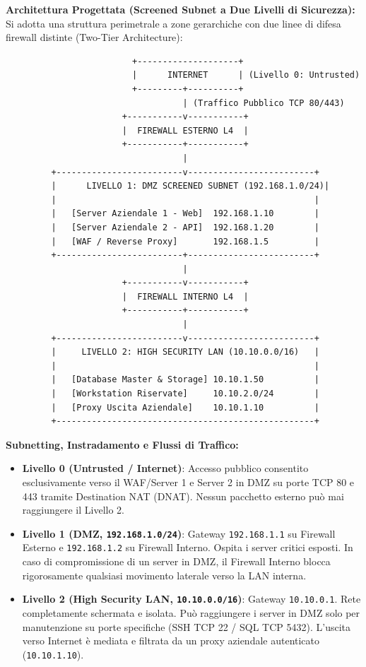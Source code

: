 \documentclass[11pt,a4paper]{article}
\begin{document}
\begin{solutionbox}
\textbf{Architettura Progettata (Screened Subnet a Due Livelli di Sicurezza):}
Si adotta una struttura perimetrale a zone gerarchiche con due linee di difesa firewall distinte (Two-Tier Architecture):
\begin{center}
\begin{verbatim}
                         +--------------------+
                         |      INTERNET      | (Livello 0: Untrusted)
                         +---------+----------+
                                   | (Traffico Pubblico TCP 80/443)
                       +-----------v-----------+
                       |  FIREWALL ESTERNO L4  |
                       +-----------+-----------+
                                   |
         +-------------------------v-------------------------+
         |      LIVELLO 1: DMZ SCREENED SUBNET (192.168.1.0/24)|
         |                                                   |
         |   [Server Aziendale 1 - Web]  192.168.1.10        |
         |   [Server Aziendale 2 - API]  192.168.1.20        |
         |   [WAF / Reverse Proxy]       192.168.1.5         |
         +-------------------------+-------------------------+
                                   |
                       +-----------v-----------+
                       |  FIREWALL INTERNO L4  |
                       +-----------+-----------+
                                   |
         +-------------------------v-------------------------+
         |     LIVELLO 2: HIGH SECURITY LAN (10.10.0.0/16)   |
         |                                                   |
         |   [Database Master & Storage] 10.10.1.50          |
         |   [Workstation Riservate]     10.10.2.0/24        |
         |   [Proxy Uscita Aziendale]    10.10.1.10          |
         +---------------------------------------------------+
\end{verbatim}
\end{center}

\textbf{Subnetting, Instradamento e Flussi di Traffico:}
\begin{itemize}
    \item \textbf{Livello 0 (Untrusted / Internet)}: Accesso pubblico consentito esclusivamente verso il WAF/Server 1 e Server 2 in DMZ su porte TCP 80 e 443 tramite Destination NAT (DNAT). Nessun pacchetto esterno pu\`o mai raggiungere il Livello 2.
    \item \textbf{Livello 1 (DMZ, \texttt{192.168.1.0/24})}: Gateway \texttt{192.168.1.1} su Firewall Esterno e \texttt{192.168.1.2} su Firewall Interno. Ospita i server critici esposti. In caso di compromissione di un server in DMZ, il Firewall Interno blocca rigorosamente qualsiasi movimento laterale verso la LAN interna.
    \item \textbf{Livello 2 (High Security LAN, \texttt{10.10.0.0/16})}: Gateway \texttt{10.10.0.1}. Rete completamente schermata e isolata. Pu\`o raggiungere i server in DMZ solo per manutenzione su porte specifiche (SSH TCP 22 / SQL TCP 5432). L'uscita verso Internet \`e mediata e filtrata da un proxy aziendale autenticato (\texttt{10.10.1.10}).
\end{itemize}


\end{solutionbox}
\end{document}
